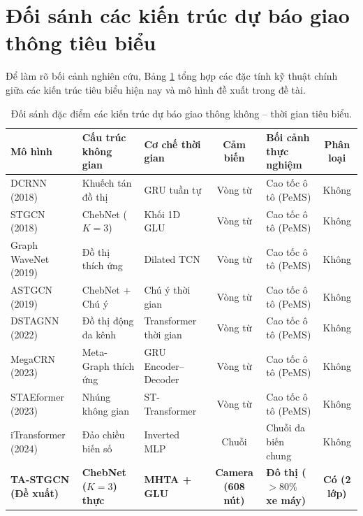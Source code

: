 \section{Đối sánh các kiến trúc dự báo giao thông tiêu biểu}
Để làm rõ bối cảnh nghiên cứu, Bảng \ref{tab:so_sanh_sota_toan_dien} tổng hợp các đặc tính kỹ thuật chính giữa các kiến trúc tiêu biểu hiện nay và mô hình đề xuất trong đề tài.

\begin{table}[htbp]
\centering
\footnotesize
\caption{Đối sánh đặc điểm các kiến trúc dự báo giao thông không -- thời gian tiêu biểu.}
\label{tab:so_sanh_sota_toan_dien}
\renewcommand{\arraystretch}{1.2}
\setlength{\tabcolsep}{3.5pt}
\begin{tabularx}{\textwidth}{l >{\raggedright\arraybackslash}p{2.6cm} >{\raggedright\arraybackslash}p{2.3cm} c >{\raggedright\arraybackslash}X c}
\toprule
\textbf{Mô hình} & \textbf{Cấu trúc không gian} & \textbf{Cơ chế thời gian} & \textbf{Cảm biến} & \textbf{Bối cảnh thực nghiệm} & \textbf{Phân loại} \\
\midrule
DCRNN (2018) & Khuếch tán đồ thị & GRU tuần tự & Vòng từ & Cao tốc ô tô (PeMS) & Không \\
STGCN (2018) & ChebNet ($K=3$) & Khối 1D GLU & Vòng từ & Cao tốc ô tô (PeMS) & Không \\
Graph WaveNet (2019) & Đồ thị thích ứng & Dilated TCN & Vòng từ & Cao tốc ô tô (PeMS) & Không \\
ASTGCN (2019) & ChebNet + Chú ý & Chú ý thời gian & Vòng từ & Cao tốc ô tô (PeMS) & Không \\
DSTAGNN (2022) & Đồ thị động đa kênh & Transformer thời gian & Vòng từ & Cao tốc ô tô (PeMS) & Không \\
MegaCRN (2023) & Meta-Graph thích ứng & GRU Encoder--Decoder & Vòng từ & Cao tốc ô tô (PeMS) & Không \\
STAEformer (2023) & Nhúng không gian & ST-Transformer & Vòng từ & Cao tốc ô tô (PeMS) & Không \\
iTransformer (2024) & Đảo chiều biến số & Inverted MLP & Chuỗi & Chuỗi đa biến chung & Không \\
\midrule
\textbf{TA-STGCN (Đề xuất)} & \textbf{ChebNet ($K=3$) thực} & \textbf{MHTA + GLU} & \textbf{Camera (608 nút)} & \textbf{Đô thị ($>80\%$ xe máy)} & \textbf{Có (2 lớp)} \\
\bottomrule
\end{tabularx}
\end{table}

